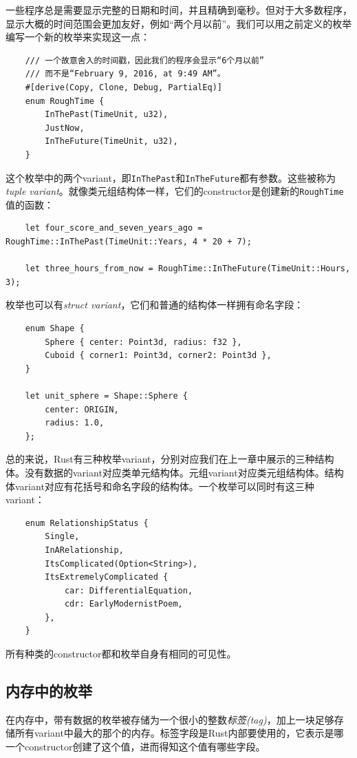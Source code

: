 一些程序总是需要显示完整的日期和时间，并且精确到毫秒。但对于大多数程序，显示大概的时间范围会更加友好，例如“两个月以前”。我们可以用之前定义的枚举编写一个新的枚举来实现这一点：
\begin{verbatim}
    /// 一个故意舍入的时间戳，因此我们的程序会显示“6个月以前”
    /// 而不是“February 9, 2016, at 9:49 AM”。
    #[derive(Copy, Clone, Debug, PartialEq)]
    enum RoughTime {
        InThePast(TimeUnit, u32),
        JustNow,
        InTheFuture(TimeUnit, u32),
    }
\end{verbatim}

这个枚举中的两个variant，即\texttt{InThePast}和\texttt{InTheFuture}都有参数。这些被称为\emph{tuple variant}。就像类元组结构体一样，它们的constructor是创建新的\texttt{RoughTime}值的函数：
\begin{verbatim}
    let four_score_and_seven_years_ago = RoughTime::InThePast(TimeUnit::Years, 4 * 20 + 7);

    let three_hours_from_now = RoughTime::InTheFuture(TimeUnit::Hours, 3);
\end{verbatim}

枚举也可以有\emph{struct variant}，它们和普通的结构体一样拥有命名字段：
\begin{verbatim}
    enum Shape {
        Sphere { center: Point3d, radius: f32 },
        Cuboid { corner1: Point3d, corner2: Point3d },
    }

    let unit_sphere = Shape::Sphere {
        center: ORIGIN,
        radius: 1.0,
    };
\end{verbatim}

总的来说，Rust有三种枚举variant，分别对应我们在上一章中展示的三种结构体。没有数据的variant对应类单元结构体。元组variant对应类元组结构体。结构体variant对应有花括号和命名字段的结构体。一个枚举可以同时有这三种variant：
\begin{verbatim}
    enum RelationshipStatus {
        Single,
        InARelationship,
        ItsComplicated(Option<String>),
        ItsExtremelyComplicated {
            car: DifferentialEquation, 
            cdr: EarlyModernistPoem,
        },
    }
\end{verbatim}

所有种类的constructor都和枚举自身有相同的可见性。

\subsection{内存中的枚举}

在内存中，带有数据的枚举被存储为一个很小的整数\emph{标签(tag)}，加上一块足够存储所有variant中最大的那个的内存。标签字段是Rust内部要使用的，它表示是哪一个constructor创建了这个值，进而得知这个值有哪些字段。

